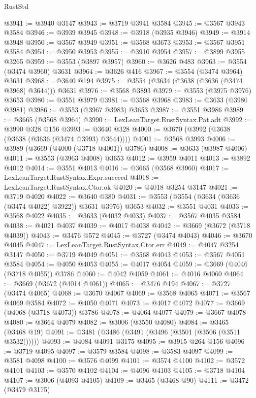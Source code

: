 \begin{lexlean}{RustStd}
\begin{coremodule}
@3941 := @3940 @3147
@3943 := @3719 @3941 @3584
@3945 := @3567 @3943 @3584
@3946 := @3939 @3945
@3948 := @3918 (@3935 @3946)
@3949 := @3914 @3948
@3950 := @3567 @3949
@3951 := @3568 @3673
@3953 := @3567 @3951 @3584
@3954 := @3950 @3953
@3955 := @3910 @3954
@3957 := @3899 @3955 @3265
@3959 := @3553 (@3897 @3957)
@3960 := @3626 @483
@3963 := @3554 (@3474 @3960) @3631
@3964 := @3626 @416
@3967 := @3554 (@3474 @3964) @3631
@3968 := @3640 @194
@3975 := @3554 (@3634 (@3638 (@3636 (@3474 @3968) @3644))) @3631
@3976 := @3568 @3893
@3979 := @3553 (@3975 @3976) @3653
@3980 := @3551 @3979
@3981 := @3568 @3968
@3983 := @3633 (@3980 @3981)
@3986 := @3553 (@3967 @3983) @3653
@3987 := @3551 @3986
@3989 := @3665 (@3568 @3964)
@3990 := LexLeanTarget.RustSyntax.Pat.adt
@3992 := @3990 @328 @156
@3993 := @3640 @328
@4000 := @3670 (@3992 (@3638 (@3638 (@3636 (@3474 @3993) @3644))))
@4001 := @3568 @3993
@4006 := @3989 (@3669 (@4000 (@3718 @4001)) @3786)
@4008 := @3633 (@3987 @4006)
@4011 := @3553 (@3963 @4008) @3653
@4012 := @3959 @4011
@4013 := @3892 @4012
@4014 := @3551 @4013
@4016 := @3665 (@3568 @3960)
@4017 := LexLeanTarget.RustSyntax.Expr.succeed
@4018 := LexLeanTarget.RustSyntax.Ctor.ok
@4020 := @4018 @3254 @3147
@4021 := @3719 @4020
@4022 := @3640 @380
@4031 := @3553 (@3554 (@3634 (@3636 (@3474 @4022) @3922)) @3631 @3976) @3653
@4032 := @3551 @4031
@4033 := @3568 @4022
@4035 := @3633 (@4032 @4033)
@4037 := @3567 @4035 @3584
@4038 := @4021 @4037
@4039 := @4017 @4038
@4042 := @3669 (@3672 (@3718 @4039))
@4043 := @3476 @572
@4045 := @3727 (@3474 @4043)
@4046 := @3670 @4045
@4047 := LexLeanTarget.RustSyntax.Ctor.err
@4049 := @4047 @3254 @3147
@4050 := @3719 @4049
@4051 := @3568 @4043
@4053 := @3567 @4051 @3584
@4054 := @4050 @4053
@4055 := @4017 @4054
@4059 := @3669 (@4046 (@3718 @4055)) @3786
@4060 := @4042 @4059
@4061 := @4016 @4060
@4064 := @3669 (@3672 (@4014 @4061))
@4065 := @3476 @194
@4067 := @3727 (@3474 @4065)
@4068 := @3670 @4067
@4069 := @3568 @4065
@4071 := @3567 @4069 @3584
@4072 := @4050 @4071
@4073 := @4017 @4072
@4077 := @3669 (@4068 (@3718 @4073)) @3786
@4078 := @4064 @4077
@4079 := @3667 @4078
@4080 := @3664 @4079
@4082 := @3006 (@3550 @4080)
@4084 := @3465 (@3468 @19)
@4091 := @3481 (@3486 (@3491 (@3496 (@3501 (@3506 (@3511 @3532))))))
@4093 := @4084 @4091 @3175
@4095 := @3915 @264 @156
@4096 := @3719 @4095
@4097 := @3579 @3584
@4098 := @3583 @4097
@4099 := @3581 @4098
@4100 := @3576 @4099
@4101 := @3574 @4100
@4102 := @3572 @4101
@4103 := @3570 @4102
@4104 := @4096 @4103
@4105 := @3718 @4104
@4107 := @3006 (@4093 @4105)
@4109 := @3465 (@3468 @90)
@4111 := @3472 (@3479 @3175)

\end{coremodule}
\end{lexlean}
